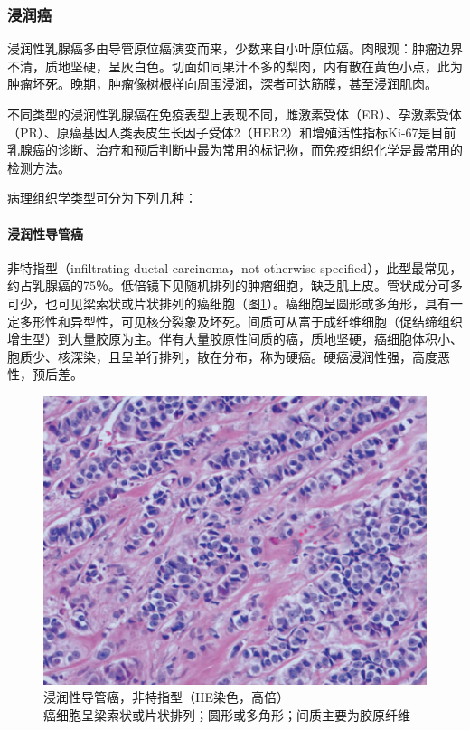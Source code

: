\subsubsection{浸润癌}

浸润性乳腺癌多由导管原位癌演变而来，少数来自小叶原位癌。肉眼观：肿瘤边界不清，质地坚硬，呈灰白色。切面如同果汁不多的梨肉，内有散在黄色小点，此为肿瘤坏死。晚期，肿瘤像树根样向周围浸润，深者可达筋膜，甚至浸润肌肉。

不同类型的浸润性乳腺癌在免疫表型上表现不同，雌激素受体（ER）、孕激素受体（PR）、原癌基因人类表皮生长因子受体2（HER2）和增殖活性指标Ki-67是目前乳腺癌的诊断、治疗和预后判断中最为常用的标记物，而免疫组织化学是最常用的检测方法。

病理组织学类型可分为下列几种：

\paragraph{浸润性导管癌}
非特指型（infiltrating ductal carcinoma，not
otherwise
specified），此型最常见，约占乳腺癌的75％。低倍镜下见随机排列的肿瘤细胞，缺乏肌上皮。管状成分可多可少，也可见梁索状或片状排列的癌细胞（图\ref{fig11-16}）。癌细胞呈圆形或多角形，具有一定多形性和异型性，可见核分裂象及坏死。间质可从富于成纤维细胞（促结缔组织增生型）到大量胶原为主。伴有大量胶原性间质的癌，质地坚硬，癌细胞体积小、胞质少、核深染，且呈单行排列，散在分布，称为硬癌。硬癌浸润性强，高度恶性，预后差。

\begin{figure}[!htbp]
 \centering
 \includegraphics{./images/Image00203.jpg}
 \captionsetup{justification=centering}
 \caption{浸润性导管癌，非特指型（HE染色，高倍）\\ {\small 癌细胞呈梁索状或片状排列；圆形或多角形；间质主要为胶原纤维}}
\label{fig11-16}
  \end{figure}

